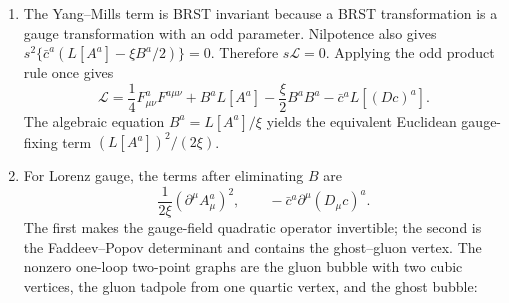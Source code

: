 \begin{enumerate}
\begin{enumerate}
    \item[(c)] The Yang--Mills term is BRST invariant because a BRST
      transformation is a gauge transformation with an odd parameter.
      Nilpotence also gives
      \(s^2\{\bar c^a(L[A^a]-\xi B^a/2)\}=0\).  Therefore
      \(s\mathcal L=0\).  Applying the odd product rule once gives
      \[
        \boxed{\mathcal L=\frac14F^a_{\mu\nu}F^{a\mu\nu}
          +B^aL[A^a]-\frac\xi2B^aB^a
          -\bar c^aL[(D c)^a].}
      \]
      The algebraic equation \(B^a=L[A^a]/\xi\) yields the equivalent
      Euclidean gauge-fixing term \((L[A^a])^2/(2\xi)\).

    \item[(d)] For Lorenz gauge, the terms after eliminating \(B\) are
      \[
        \frac{1}{2\xi}(\partial^\mu A_\mu^a)^2,
        \qquad
        -\bar c^a\partial^\mu(D_\mu c)^a.
      \]
      The first makes the gauge-field quadratic operator invertible; the
      second is the Faddeev--Popov determinant and contains the
      ghost--gluon vertex.  The nonzero one-loop two-point graphs are the
      gluon bubble with two cubic vertices, the gluon tadpole from one
      quartic vertex, and the ghost bubble:
      \begin{center}
\end{center}
\end{enumerate}
\end{enumerate}

